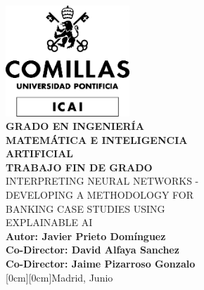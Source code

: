 \documentclass[12pt]{extarticle}
\numberwithin{equation}{section}
\begin{document}
\begin{titlepage}
    \centering
    \includegraphics[width=0.35\textwidth]{images/Logo_comillas.png}\\[1cm] 
    {\Huge \textbf{GRADO EN INGENIERÍA}}\\[0.3cm]
    {\Huge \textbf{MATEMÁTICA E INTELIGENCIA}}\\[0.5cm]
    {\Huge \textbf{ARTIFICIAL}}\\[1.5cm]
    {\Huge \textbf{TRABAJO FIN DE GRADO}}\\[1.3cm]
    {\huge INTERPRETING NEURAL NETWORKS -}\\[0.4cm]
    {\huge DEVELOPING A METHODOLOGY FOR }\\[0.4cm]
    {\huge BANKING CASE STUDIES USING }\\[0.4cm]
    {\huge EXPLAINABLE AI}\\[0.4cm]
    \textbf{Autor: Javier Prieto Domínguez}\\[0.5cm]
    \textbf{Co-Director: David Alfaya Sanchez}\\[0.5cm]
    \textbf{Co-Director: Jaime Pizarroso Gonzalo}\\
    \raisebox {-2cm}[0cm][0cm]{\large Madrid, Junio}
    \vfill
\end{titlepage}

\setlength{\headheight}{2cm}

\pagestyle{fancy}
\fancyhf{}

\end{document}

